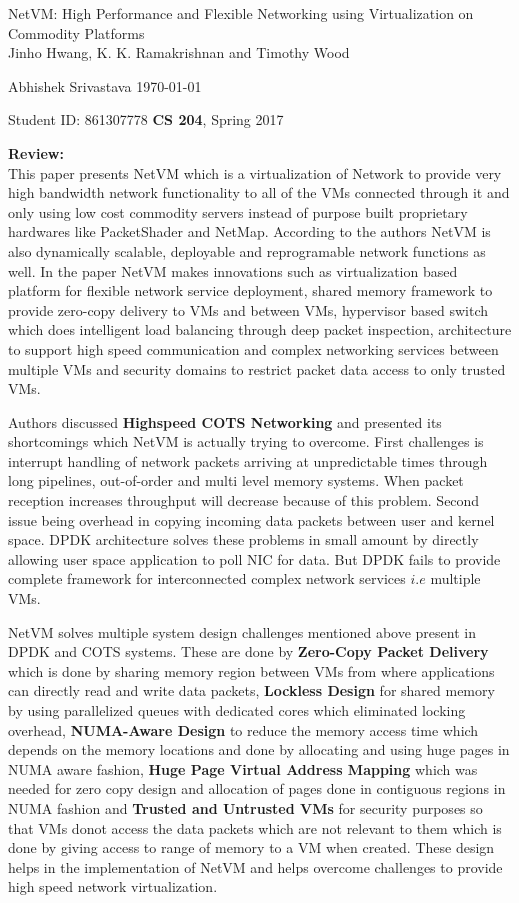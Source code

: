 \documentclass[a4paper,12pt, twoside]{article}
\renewcommand{\maketitle}{%
 	\Large
 	\begin{center}
 	NetVM: High Performance and Flexible Networking
 	using Virtualization on Commodity Platforms\\	
 	\normalsize Jinho Hwang, K. K. Ramakrishnan and Timothy Wood
 	\end{center}
 
 	\Large
	Abhishek Srivastava
	\hfill
	\normalsize
	\today
 	\par
 	Student ID: 861307778
 	\hfill
 	\textbf{CS 204}, Spring 2017
 	\par 	
 	\hrulefill
 	\par
 	}
\begin{document}
\thispagestyle{empty}
	
\maketitle

\textbf{Review:}\\

This paper presents NetVM which is a virtualization of Network to provide very high bandwidth network functionality to all of the VMs connected through it and only using low cost commodity servers instead of purpose built proprietary hardwares like PacketShader and NetMap. According to the authors NetVM is also dynamically scalable, deployable and reprogramable network functions as well. In the paper NetVM makes innovations such as virtualization based platform for flexible network service deployment, shared memory framework to provide zero-copy delivery to VMs and between VMs, hypervisor based switch which does intelligent load balancing through deep packet inspection, architecture to support high speed communication and complex networking services between multiple VMs and security domains to restrict packet data access to only trusted VMs.

Authors discussed \textbf{Highspeed COTS Networking} and presented its shortcomings which NetVM is actually trying to overcome. First challenges is interrupt handling of network packets arriving at unpredictable times through long pipelines, out-of-order and multi level memory systems. When packet reception increases throughput will decrease because of this problem. Second issue being overhead in copying incoming data packets between user and kernel space. DPDK architecture solves these problems in small amount by directly allowing user space application to poll NIC for data. But DPDK fails to provide complete framework for interconnected complex network services $i.e$ multiple VMs. 

NetVM solves multiple system design challenges mentioned above present in DPDK and COTS systems. These are done by \textbf{Zero-Copy Packet Delivery} which is done by sharing memory region between VMs from where applications can directly read and write data packets, \textbf{Lockless Design} for shared memory by using parallelized queues with dedicated cores which eliminated locking overhead, \textbf{NUMA-Aware Design} to reduce the memory access time which depends on the memory locations and done by allocating and using huge pages in NUMA aware fashion, \textbf{Huge Page Virtual Address Mapping} which was needed for zero copy design and allocation of pages done in contiguous regions in NUMA fashion and \textbf{Trusted and Untrusted VMs} for security purposes so that VMs donot access the data packets which are not relevant to them which is done by giving access to range of memory to a VM when created. These design helps in the implementation of NetVM and helps overcome challenges to provide high speed network virtualization.\\
\end{document}

